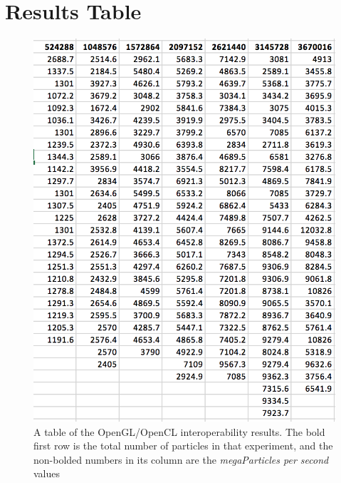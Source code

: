 \documentclass[onecolumn,draftclsnofoot, 10pt, compsoc]{IEEEtran}
\begin{document}
	
	



\section{Results Table}

	\begin{figure}[H]
		\includegraphics[width=16cm]{table}
		\centering
		\caption{A table of the OpenGL/OpenCL interoperability results. The bold first row is the total number of particles in that experiment, and the non-bolded numbers in its column are the \textit{megaParticles per second} values}
	\end{figure}
\end{document}

